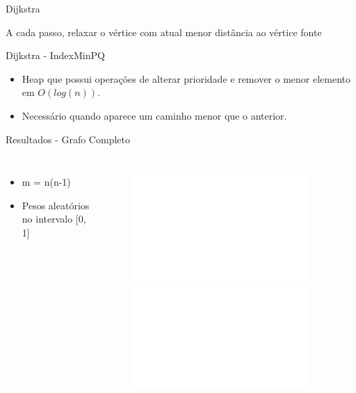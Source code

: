 \documentclass[aspectratio=169,usenames,dvipsnames]{beamer}
\begin{document}
\begin{frame}{Dijkstra} 

    A cada passo, relaxar o vértice com atual menor distância ao vértice fonte

    \vfill


    \vfill
    
\end{frame}

\begin{frame}{Dijkstra - IndexMinPQ}
    \vfill
    \begin{itemize}
        \item Heap que possui operações de alterar prioridade e remover o menor elemento em $O(log(n))$.
        \item Necessário quando aparece um caminho menor que o anterior. 
    \end{itemize}
    \vfill
\end{frame}


\begin{frame}{Resultados - Grafo Completo}
    \begin{columns}
        \begin{itemize}
            \item m = n(n-1)
            \item Pesos aleatórios no intervalo [0, 1]
        \end{itemize}
    \begin{figure}[ht]
        \centering
        \includegraphics<1>[width=0.9\textwidth]{figs/complete_graphs.pdf}
        \includegraphics<2>[width=0.9\textwidth]{figs/complete_graphs_log.pdf}
    \end{figure}

    \end{columns}

\end{frame}
\end{document}
